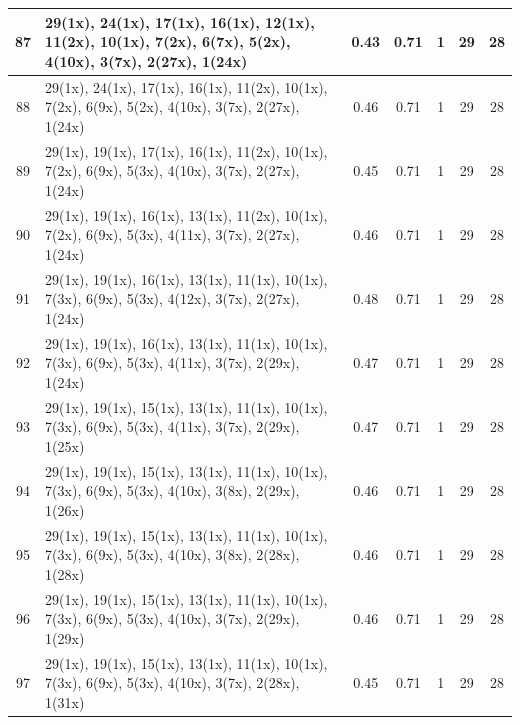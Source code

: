\begin{small}
\begin{longtable}{|c|p{4cm}|c|c|c|c|c|}
  87 & 29(1x), 24(1x), 17(1x), 16(1x), 12(1x), 11(2x), 10(1x), 7(2x), 6(7x), 5(2x), 4(10x), 3(7x), 2(27x), 1(24x) & \cellcolor{colorGood}  0.43 & \cellcolor{colorGood} 0.71 & 1 & 29 & \cellcolor{colorBad} 28 \\   \hline
  88 & 29(1x), 24(1x), 17(1x), 16(1x), 11(2x), 10(1x), 7(2x), 6(9x), 5(2x), 4(10x), 3(7x), 2(27x), 1(24x) & \cellcolor{colorGood}  0.46 & \cellcolor{colorGood} 0.71 & 1 & 29 & \cellcolor{colorBad} 28 \\   \hline
  89 & 29(1x), 19(1x), 17(1x), 16(1x), 11(2x), 10(1x), 7(2x), 6(9x), 5(3x), 4(10x), 3(7x), 2(27x), 1(24x) & \cellcolor{colorGood}  0.45 & \cellcolor{colorGood} 0.71 & 1 & 29 & \cellcolor{colorBad} 28 \\   \hline
  90 & 29(1x), 19(1x), 16(1x), 13(1x), 11(2x), 10(1x), 7(2x), 6(9x), 5(3x), 4(11x), 3(7x), 2(27x), 1(24x) & \cellcolor{colorGood}  0.46 & \cellcolor{colorGood} 0.71 & 1 & 29 & \cellcolor{colorBad} 28 \\   \hline
  91 & 29(1x), 19(1x), 16(1x), 13(1x), 11(1x), 10(1x), 7(3x), 6(9x), 5(3x), 4(12x), 3(7x), 2(27x), 1(24x) & \cellcolor{colorGood}  0.48 & \cellcolor{colorGood} 0.71 & 1 & 29 & \cellcolor{colorBad} 28 \\   \hline
  92 & 29(1x), 19(1x), 16(1x), 13(1x), 11(1x), 10(1x), 7(3x), 6(9x), 5(3x), 4(11x), 3(7x), 2(29x), 1(24x) & \cellcolor{colorGood}  0.47 & \cellcolor{colorGood} 0.71 & 1 & 29 & \cellcolor{colorBad} 28 \\   \hline
  93 & 29(1x), 19(1x), 15(1x), 13(1x), 11(1x), 10(1x), 7(3x), 6(9x), 5(3x), 4(11x), 3(7x), 2(29x), 1(25x) & \cellcolor{colorGood}  0.47 & \cellcolor{colorGood} 0.71 & 1 & 29 & \cellcolor{colorBad} 28 \\   \hline
  94 & 29(1x), 19(1x), 15(1x), 13(1x), 11(1x), 10(1x), 7(3x), 6(9x), 5(3x), 4(10x), 3(8x), 2(29x), 1(26x) & \cellcolor{colorGood}  0.46 & \cellcolor{colorGood} 0.71 & 1 & 29 & \cellcolor{colorBad} 28 \\   \hline
  95 & 29(1x), 19(1x), 15(1x), 13(1x), 11(1x), 10(1x), 7(3x), 6(9x), 5(3x), 4(10x), 3(8x), 2(28x), 1(28x) & \cellcolor{colorGood}  0.46 & \cellcolor{colorGood} 0.71 & 1 & 29 & \cellcolor{colorBad} 28 \\   \hline
  96 & 29(1x), 19(1x), 15(1x), 13(1x), 11(1x), 10(1x), 7(3x), 6(9x), 5(3x), 4(10x), 3(7x), 2(29x), 1(29x) & \cellcolor{colorGood}  0.46 & \cellcolor{colorGood} 0.71 & 1 & 29 & \cellcolor{colorBad} 28 \\   \hline
  97 & 29(1x), 19(1x), 15(1x), 13(1x), 11(1x), 10(1x), 7(3x), 6(9x), 5(3x), 4(10x), 3(7x), 2(28x), 1(31x) & \cellcolor{colorGood}  0.45 & \cellcolor{colorGood} 0.71 & 1 & 29 & \cellcolor{colorBad} 28 \\   \hline

\end{longtable}
\end{small}
